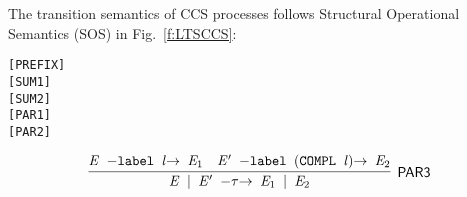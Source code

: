 The transition semantics of CCS processes follows Structural
Operational Semantics (SOS) in Fig.~\ref{f:LTSCCS}:
\begin{alltt}
\HOLTokenTurnstile{} \HOLSymConst{\ensuremath{\ldotp}} \HOLTokenTransBegin{}\HOLTokenTransEnd {}\hfill\texttt{[PREFIX]}
\HOLTokenTurnstile{}  \HOLTokenTransBegin{}\HOLTokenTransEnd {} \HOLSymConst{\HOLTokenImp{}}  \HOLSymConst{\ensuremath{+}}  \HOLTokenTransBegin{}\HOLTokenTransEnd {}\hfill\texttt{[SUM1]}
\HOLTokenTurnstile{}  \HOLTokenTransBegin{}\HOLTokenTransEnd {} \HOLSymConst{\HOLTokenImp{}}  \HOLSymConst{\ensuremath{+}}  \HOLTokenTransBegin{}\HOLTokenTransEnd {}\hfill\texttt{[SUM2]}
\HOLTokenTurnstile{}  \HOLTokenTransBegin{}\HOLTokenTransEnd {} \HOLSymConst{\HOLTokenImp{}}  \HOLSymConst{\ensuremath{\mid}}  \HOLTokenTransBegin{}\HOLTokenTransEnd {} \HOLSymConst{\ensuremath{\mid}} \hfill\texttt{[PAR1]}
\HOLTokenTurnstile{}  \HOLTokenTransBegin{}\HOLTokenTransEnd {} \HOLSymConst{\HOLTokenImp{}}  \HOLSymConst{\ensuremath{\mid}}  \HOLTokenTransBegin{}\HOLTokenTransEnd {} \HOLSymConst{\ensuremath{\mid}} \hfill\texttt{[PAR2]}
\end{alltt}

\begin{equation}
\infer[\HOLRuleName{PAR3}]{\HOLinline{\HOLFreeVar{E} \HOLSymConst{\ensuremath{\mid}} \HOLFreeVar{E\sp{\prime}} \HOLTokenTransBegin\HOLSymConst{\ensuremath{\tau}}\HOLTokenTransEnd \HOLFreeVar{E\sb{\mathrm{1}}} \HOLSymConst{\ensuremath{\mid}} \HOLFreeVar{E\sb{\mathrm{2}}}}}{\HOLinline{\HOLFreeVar{E} \HOLTokenTransBegin\HOLConst{label} \HOLFreeVar{l}\HOLTokenTransEnd \HOLFreeVar{E\sb{\mathrm{1}}}}&\HOLinline{\HOLFreeVar{E\sp{\prime}} \HOLTokenTransBegin\HOLConst{label} \ensuremath{(}\HOLConst{COMPL} \HOLFreeVar{l}\ensuremath{)}\HOLTokenTransEnd \HOLFreeVar{E\sb{\mathrm{2}}}}}
\end{equation}

